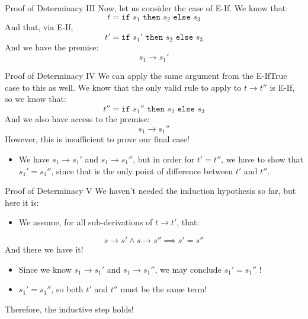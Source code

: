 \documentclass[11pt]{beamer}
\begin{document}
\begin{frame}[fragile=singleslide]{Proof of Determinacy III}
Now, let us consider the case of E-If.  We know that:
\begin{equation}
t = \texttt{if } s_1 \texttt{ then } s_2 \texttt{ else } s_3
\end{equation}
And that, via E-If,
\begin{equation}
t' = \texttt{if } s_1' \texttt{ then } s_2 \texttt{ else } s_3
\end{equation}
And we have the premise:
\begin{equation}
s_1 \rightarrow s_1'
\end{equation}
\end{frame}

\begin{frame}[fragile=singleslide]{Proof of Determinacy IV}
We can apply the same argument from the E-IfTrue case to this as well.  We know that the only valid rule to apply to $t \rightarrow t''$ is E-If, so we know that:
\begin{equation}
t'' = \texttt{if } s_1'' \texttt{ then } s_2 \texttt{ else } s_3
\end{equation}
And we also have access to the premise:
\begin{equation}
s_1 \rightarrow s_1''
\end{equation}
However, this is insufficient to prove our final case!  
\begin{itemize}
\item We have $s_1 \rightarrow s_1'$ and $s_1 \rightarrow s_1''$, but in order for $t' = t''$, we have to show that $s_1' = s_1''$, since that is the only point of difference between $t'$ and $t''$.
\end{itemize}
\end{frame}

\begin{frame}[fragile=singleslide]{Proof of Determinacy V}
We haven't needed the induction hypothesis so far, but here it is:
\begin{itemize}
\item We assume, for all sub-derivations of $t \rightarrow t'$, that:
\end{itemize}
\begin{equation}
s \rightarrow s' \land s \rightarrow s'' \implies s' = s''
\end{equation}
And there we have it!  
\begin{itemize}
\item Since we know  $s_1 \rightarrow s_1'$ and  $s_1 \rightarrow s_1''$, we may conclude $s_1' = s_1''$ ! 
\item $s_1' = s_1''$, so both $t'$ and $t''$ must be the same term! 
\end{itemize}
Therefore, the inductive step holds! 
\end{frame}
\end{document}

